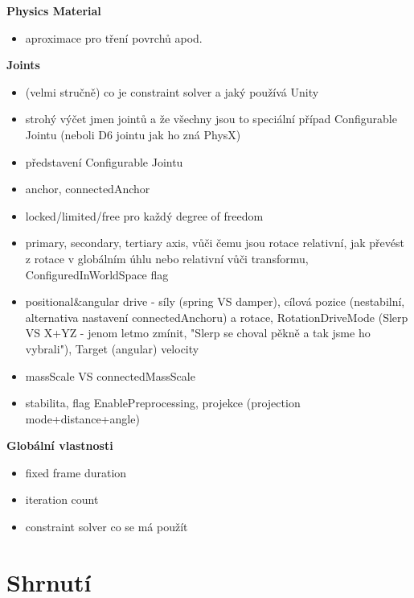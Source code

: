 \textbf{Physics Material}
\begin{itemize}
    \item aproximace pro tření povrchů apod.
\end{itemize}

\textbf{Joints}
\begin{itemize}
    \item (velmi stručně) co je constraint solver a jaký používá Unity
    \item strohý výčet jmen jointů a že všechny jsou to speciální případ Configurable Jointu (neboli D6 jointu jak ho zná PhysX)
    \item představení Configurable Jointu
    \item anchor, connectedAnchor
    \item locked/limited/free pro každý degree of freedom
    \item primary, secondary, tertiary axis, vůči čemu jsou rotace relativní, jak převést z rotace v globálním úhlu nebo relativní vůči transformu, ConfiguredInWorldSpace flag
    \item positional\&angular drive - síly (spring VS damper), cílová pozice (nestabilní, alternativa nastavení connectedAnchoru) a rotace, RotationDriveMode (Slerp VS X+YZ - jenom letmo zmínit, "Slerp se choval pěkně a tak jsme ho vybrali"), Target (angular) velocity
    \item massScale VS connectedMassScale
    \item stabilita, flag EnablePreprocessing, projekce (projection mode+distance+angle)
\end{itemize}

\textbf{Globální vlastnosti}
\begin{itemize}
    \item fixed frame duration
    \item iteration count
    \item constraint solver co se má použít
\end{itemize}


\section{Shrnutí}